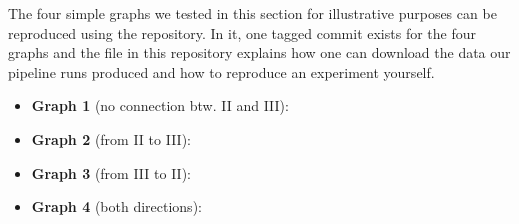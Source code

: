\begin{tcolorbox}[
    title=\faIcon{recycle} Reproducibility,
    parbox=false,
    float
]
    The four simple graphs we tested in this section for illustrative purposes can be reproduced using the  repository. In it, one tagged commit exists for the four graphs and the  file in this repository explains how one can download the data our pipeline runs produced and how to reproduce an experiment yourself.

    \begin{itemize}
        \item \textbf{Graph 1} (no connection btw. II and III): 
        \item \textbf{Graph 2} (from II to III): 
        \item \textbf{Graph 3} (from III to II): 
        \item \textbf{Graph 4} (both directions): 
    \end{itemize}
\end{tcolorbox}
